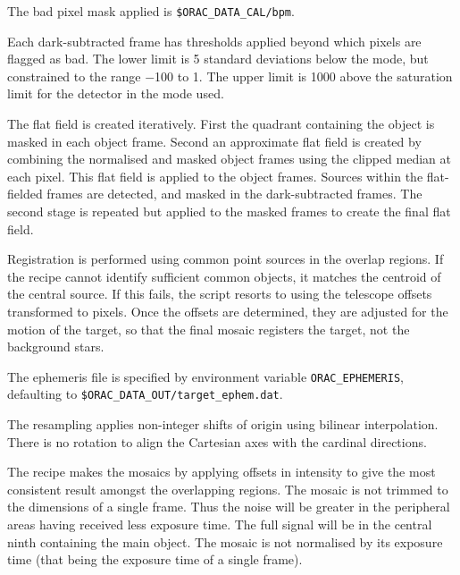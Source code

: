 \documentclass[twoside,11pt,nolof]{starlink}
\begin{document}
{{{         \sstitem
         The bad pixel mask applied is {\tt\$ORAC\_DATA\_CAL/bpm}.

         \sstitem
         Each dark-subtracted frame has thresholds applied beyond which
         pixels are flagged as bad.  The lower limit is 5 standard
         deviations below the mode, but constrained to the range $-$100 to 1.
         The upper limit is 1000 above the saturation limit for the detector
         in the mode used.

         \sstitem
         The flat field is created iteratively.  First the quadrant
         containing the object is masked in each object frame.  Second an
         approximate flat field is created by combining the normalised
         and masked object frames using the clipped median at each pixel.
         This flat field is applied to the object frames.  Sources within
         the flat-fielded frames are detected, and masked in the
         dark-subtracted frames.  The second stage is repeated but applied
         to the masked frames to create the final flat field.

         \sstitem
         Registration is performed using common point sources in the
         overlap regions.  If the recipe cannot identify sufficient common
         objects, it matches the centroid of the central source.  If this
         fails, the script resorts to using the telescope offsets
         transformed to pixels.  Once the offsets are determined, they
         are adjusted for the motion of the target, so that the final
         mosaic registers the target, not the background stars.

         \sstitem
         The ephemeris file is specified by environment variable
         {\tt{ORAC\_EPHEMERIS}}, defaulting to {\tt\$ORAC\_DATA\_OUT/target\_ephem.dat}.

         \sstitem
         The resampling applies non-integer shifts of origin using
         bilinear interpolation.  There is no rotation to align the
         Cartesian axes with the cardinal directions.

         \sstitem
         The recipe makes the mosaics by applying offsets in intensity
         to give the most consistent result amongst the overlapping regions.
         The mosaic is not trimmed to the dimensions of a single frame.  Thus
         the noise will be greater in the peripheral areas having received
         less exposure time.  The full signal will be in the central ninth
         containing the main object.  The mosaic is not normalised by its
         exposure time (that being the exposure time of a single frame).

}}}
\end{document}
